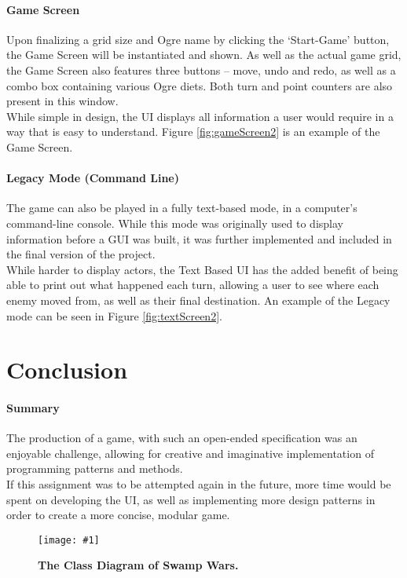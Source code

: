 \documentclass[conference]{acmsiggraph}
\newcommand{\figuremacroF}[4]{
	\begin{figure*}[t] %
		\centering
		\texttt{[image: \#1]}
		\caption[#2]{\textbf{#2}  #3}
		\label{fig:#1}
	\end{figure*}
}
\begin{document}
		\paragraph{Game Screen}
			Upon finalizing a grid size and Ogre name by clicking the ‘Start-Game’ button, the Game Screen will be instantiated and shown. As well as the actual game grid, the Game Screen also features three buttons – move, undo and redo, as well as a combo box containing various Ogre diets. Both turn and point counters are also present in this window.\\
			While simple in design, the UI displays all information a user would require in a way that is easy to understand. Figure \ref{fig:gameScreen2} is an example of the Game Screen.

		
		\paragraph{Legacy Mode (Command Line)}
			The game can also be played in a fully text-based mode, in a computer’s command-line console. While this mode was originally used to display information before a GUI was built, it was further implemented and included in the final version of the project.\\
			While harder to display actors, the Text Based UI has the added benefit of being able to print out what happened each turn, allowing a user to see where each enemy moved from, as well as their final destination. An example of the Legacy mode can be seen in Figure \ref{fig:textScreen2}.
			
	\section{Conclusion}
		\paragraph{Summary}
			The production of a game, with such an open-ended specification was an enjoyable challenge, allowing for creative and imaginative implementation of programming patterns and methods.\\ 
			If this assignment was to be attempted again in the future, more time would be spent on developing the UI, as well as implementing more design patterns in order to create a more concise, modular game.
	
		\figuremacroF
		{uml}
		{The Class Diagram of Swamp Wars.}
		{}
		{1.00}
		 					
\end{document}
